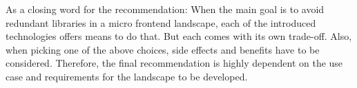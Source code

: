 As a closing word for the recommendation: 
When the main goal is to avoid redundant libraries in a micro frontend landscape, each of the introduced technologies offers means to do that. 
But each comes with its own trade-off. 
Also, when picking one of the above choices, side effects and benefits have to be considered. 
Therefore, the final recommendation is highly dependent on the use case and requirements for the landscape to be developed.

